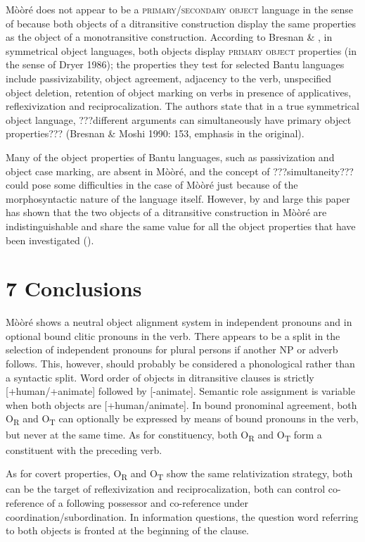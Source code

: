 \documentclass[output=paper]{langsci/langscibook}
\begin{document}
Mòòré does not appear to be a \textsc{primary}/\textsc{secondary object }language in the sense of \citet{Dryer1986} because both objects of a ditransitive construction display the same properties as the object of a monotransitive construction.{ }According to Bresnan \& \citet[147]{Moshi1991}, in symmetrical object languages, both objects display \textsc{primary object} properties (in the sense of Dryer 1986); the properties they test for selected Bantu languages include passivizability, object agreement, adjacency to the verb, unspecified object deletion, retention of object marking on verbs in presence of applicatives, reflexivization and reciprocalization. The authors state that in a true symmetrical object language, ???different arguments can simultaneously have primary object properties??? (Bresnan \& Moshi 1990: 153, emphasis in the original).

Many of the object properties of Bantu languages, such as passivization and object case marking, are absent in Mòòré, and the concept of ???simultaneity??? could pose some difficulties in the case of Mòòré just because of the morphosyntactic nature of the language itself. However, by and large this paper has shown that the two objects of a ditransitive construction in Mòòré are indistinguishable and share the same value for all the object properties that have been investigated ().  

\section{7 Conclusions}

Mòòré shows a neutral object alignment system in independent pronouns and in optional bound clitic pronouns in the verb. There appears to be a split in the selection of independent pronouns for plural persons if another NP or adverb follows. This, however, should probably be considered a phonological rather than a syntactic split. Word order of objects in ditransitive clauses is strictly [+human/+animate] followed by [-animate]. Semantic role assignment is variable when both objects are [+human/animate]. In bound pronominal agreement, both O\textsubscript{R} and O\textsubscript{T} can optionally be expressed by means of bound pronouns in the verb, but never at the same time. As for constituency, both O\textsubscript{R} and O\textsubscript{T} form a constituent with the preceding verb. 

As for covert properties, O\textsubscript{R} and O\textsubscript{T} show the same relativization strategy, both can be the target of reflexivization and reciprocalization, both can control co-reference of a following possessor and co-reference under coordination/subordination. In information questions, the question word referring to both objects is fronted at the beginning of the clause. 
\end{document}

